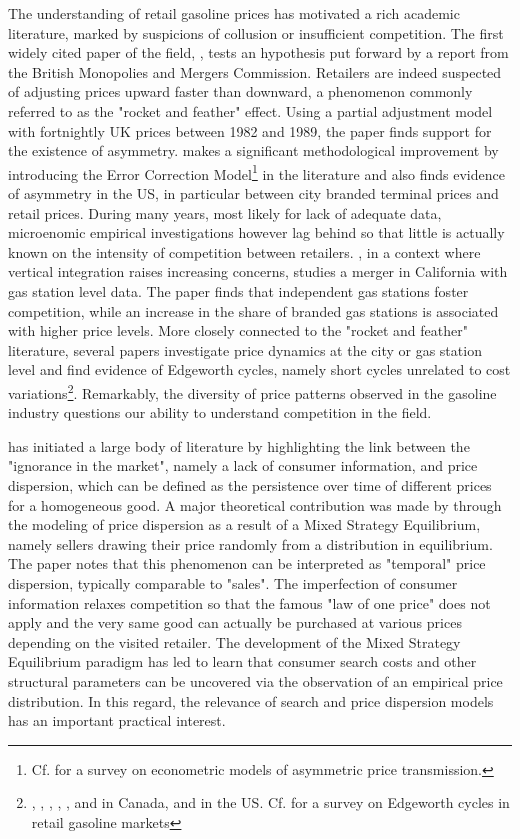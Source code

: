 \documentclass[english]{article}
\begin{document}
The understanding of retail gasoline prices has motivated a rich academic literature, marked by suspicions of collusion or insufficient competition. The first widely cited paper of the field, \cite{BAC91}, tests an hypothesis put forward by a report from the British Monopolies and Mergers Commission. Retailers are indeed suspected of adjusting prices upward faster than downward, a phenomenon commonly referred to as the "rocket and feather" effect. Using a partial adjustment model with fortnightly UK prices between 1982 and 1989, the paper finds support for the existence of asymmetry. \cite{BOR97} makes a significant methodological improvement by introducing the Error Correction Model\footnote{Cf. \cite{FRE07} for a survey on econometric models of asymmetric price transmission.} in the literature and also finds evidence of asymmetry in the US, in particular between city branded terminal prices and retail prices. During many years, most likely for lack of adequate data, microenomic empirical investigations however lag behind so that little is actually known on the intensity of competition between retailers. \cite{HAS04}, in a context where vertical integration raises increasing concerns, studies a merger in California with gas station level data. The paper finds that independent gas stations foster competition, while an increase in the share of branded gas stations is associated with higher price levels. More closely connected to the "rocket and feather" literature, several papers investigate price dynamics at the city or gas station level and find evidence of Edgeworth cycles, namely short cycles unrelated to cost variations\footnote{\cite{ECK02}, \cite{ECK03}, \cite{ECK04a}, \cite{ECK04b}, \cite{NOE07a}, \cite{NOE07b} and \cite{NOE08} in Canada, \cite{LEW09} and \cite{LEW11a} in the US. Cf. \cite{ECK13} for a survey on Edgeworth cycles in retail gasoline markets}. Remarkably, the diversity of price patterns observed in the gasoline industry questions our ability to understand competition in the field.

\cite{STI61} has initiated a large body of literature by highlighting the link between the "ignorance in the market", namely a lack of consumer information, and price dispersion, which can be defined as the persistence over time of different prices for a homogeneous good. A major theoretical contribution was made by \cite{VAR80} through the modeling of price dispersion as a result of a Mixed Strategy Equilibrium, namely sellers drawing their price randomly from a distribution in equilibrium. The paper notes that this phenomenon can be interpreted as "temporal" price dispersion, typically comparable to "sales". The imperfection of consumer information relaxes competition so that the famous "law of one price" does not apply and the very same good can actually be purchased at various prices depending on the visited retailer. The development of the Mixed Strategy Equilibrium paradigm has led to learn that consumer search costs and other structural parameters can be uncovered via the observation of an empirical price distribution. In this regard, the relevance of search and price dispersion models has an important practical interest.
\end{document}
